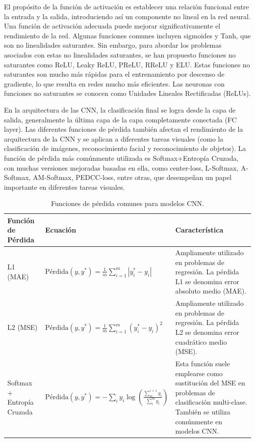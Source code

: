 El propósito de la función de activación es establecer una relación funcional entre la entrada y la salida, introduciendo así un componente no lineal en la red neural. Una función de activación adecuada puede mejorar significativamente el rendimiento de la red. Algunas funciones comunes incluyen sigmoides y Tanh, que son no linealidades saturantes. Sin embargo, para abordar los problemas asociados con estas no linealidades saturantes, se han propuesto funciones no saturantes como ReLU, Leaky ReLU, PReLU, RReLU y ELU. Estas funciones no saturantes son mucho más rápidas para el entrenamiento por descenso de gradiente, lo que resulta en redes mucho más eficientes. Las neuronas con funciones no saturantes se conocen como Unidades Lineales Rectificadas (ReLUs).

En la arquitectura de las CNN, la clasificación final se logra desde la capa de salida, generalmente la última capa de la capa completamente conectada (FC layer). Las diferentes funciones de pérdida también afectan el rendimiento de la arquitectura de la CNN y se aplican a diferentes tareas visuales (como la clasificación de imágenes, reconocimiento facial y reconocimiento de objetos). La función de pérdida más comúnmente utilizada es Softmax+Entropía Cruzada, con muchas versiones mejoradas basadas en ella, como center-loss, L-Softmax, A-Softmax, AM-Softmax, PEDCC-loss, entre otras, que desempeñan un papel importante en diferentes tareas visuales.

\begin{table}[H]
	\centering
	\caption{Funciones de pérdida comunes para modelos CNN.}
	\label{tab:loss_functions}
	\begin{tabular}{p{3cm}p{5cm}p{7cm}}
		\toprule
		Función de Pérdida & Ecuación & Característica \\
		\bottomrule
		L1 (MAE) & $\text{Pérdida}(y, y^*) = \frac{1}{m} \sum_{i=1}^{m} |y^*_i - y_i|$ & Ampliamente utilizado en problemas de regresión. La pérdida L1 se denomina error absoluto medio (MAE). \\
		\midrule
		L2 (MSE) & $\text{Pérdida}(y, y^*) = \frac{1}{m} \sum_{i=1}^{m} (y^*_i - y_i)^2$ & Ampliamente utilizado en problemas de regresión. La pérdida L2 se denomina error cuadrático medio (MSE). \\
		\midrule
		Softmax + Entropía Cruzada & $\text{Pérdida}(y, y^*) = - \sum_{i} y_i \log\left(\frac{\sum_{m}^{i=1} y_i}{\sum_{i}^{m} y_i}\right)$ & Esta función suele emplearse como sustitución del MSE en problemas de clasificación multi-clase. También se utiliza comúnmente en modelos CNN. \\
		\midrule
	\end{tabular}
\end{table}


